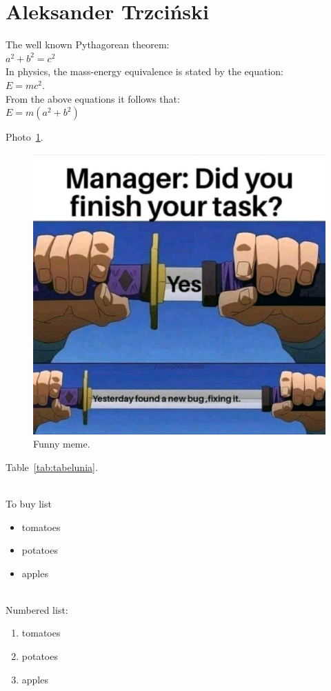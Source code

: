 \newpage
\section{Aleksander Trzciński}

The well known Pythagorean theorem:
\\
\(a^2 + b^2 = c^2\) 
\\
In physics, the mass-energy equivalence is stated 
by the equation:
\\
\(E=mc^2\).
\\
From the above equations it follows that:
\\
\(E=m(a^2 + b^2)\)

Photo~\ref{fig:IT meme}.
\begin{figure}[htbp]
    \centering
    \includegraphics[width=1\textwidth]{Pictures/IT meme.jpg}
    \caption{Funny meme.}
    \label{fig:IT meme}
\end{figure}

\newpage

Table~\ref{tab:tabelunia}.

\\
To buy list
\begin{itemize}
  \item tomatoes
  \item potatoes
  \item apples
\end{itemize}
\\
Numbered list:
\begin{enumerate}
  \item tomatoes
  \item potatoes
  \item apples
\end{enumerate}

